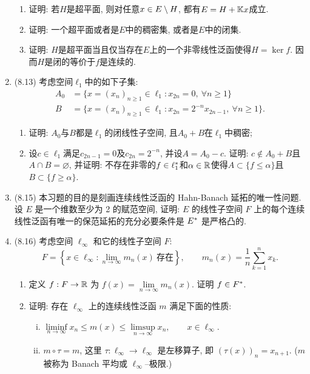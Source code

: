 \begin{enumerate}[label=\textbf{\arabic*.}, ref=\arabic*]
\begin{enumerate}[(1)]
			\item 证明: 若$ H $是超平面, 则对任意$ x\in E\setminus H $, 都有$ E=H+\mathbb{K} x $成立.
			\item 证明: 一个超平面或者是$ E $中的稠密集, 或者是$ E $中的闭集.
			\item 证明: $ H $是超平面当且仅当存在$ E $上的一个非零线性泛函使得$ H=\ker f $. 因而$ H $是闭的等价于$ f $是连续的.
			\end{enumerate}
		\item (8.13) 考虑空间$ \ell_1 $中的如下子集:
			\[
			\begin{aligned}
			A_0&=\{ x=(x_n)_{n\geqslant 1}\in\ell_1 : x_{2n}=0,\ \forall n\geqslant 1 \}\\
			B&=\{ x=(x_n)_{n\geqslant 1}\in\ell_1 : x_{2n}=2^{-n}x_{2n-1},\ \forall n\geqslant 1 \}.
			\end{aligned}
			\]
			\begin{enumerate}[(1)]
			\item 证明: $ A_0 $与$ B $都是$ \ell_1 $的闭线性子空间, 且$ A_0+B $在$\ell_1 $中稠密;
			\item 设$ c\in\ell_1 $满足$ c_{2n-1}=0 $及$ c_{2n}=2^{-n} $, 并设$ A=A_0-c $. 证明: $ c\notin A_0+B $且$ A\cap B=\varnothing $, 并证明: 不存在非零的$ f\in\ell_1^{*} $和$ \alpha\in\mathbb{R} $使得$ A\subset\{ f\leqslant\alpha \} $且$ B\subset\{ f\geqslant\alpha \} $.
			\end{enumerate}
		\item (8.15) 本习题的目的是刻画连续线性泛函的 Hahn-Banach 延拓的唯一性问题. 设 $ E $ 是一个维数至少为 2 的赋范空间, 证明: $ E $ 的线性子空间 $ F $ 上的每个连续线性泛函有唯一的保范延拓的充分必要条件是 $ E^{*} $ 是严格凸的.
		\item (8.16) 考虑空间 $ \ell_{\infty} $ 和它的线性子空间 $ F $:
			\[
				F = \left\{ x\in\ell_{\infty}:\lim_{n\to\infty} m_{n}(x)\ \text{存在} \right\}, \qquad m_{n}(x)=\frac{1}{n}\sum_{k=1}^{n} x_{k}.
			\]
			\begin{enumerate}[(1)]
				\item 定义 $ f:F\to\mathbb{R} $ 为 $ f(x)=\lim\limits_{n\to\infty}m_{n}(x) $. 证明 $ f\in F^{*} $.
				\item 证明: 存在 $ \ell_{\infty} $ 上的连续线性泛函 $ m $ 满足下面的性质:
				\begin{enumerate}[(i)]
					\item $ \liminf\limits_{n\to\infty}x_{n}\leqslant m(x)\leqslant\limsup\limits_{n\to\infty}x_{n}, \qquad x\in\ell_{\infty} $.
					\item $ m\circ \tau=m $, 这里 $ \tau: \ell_{\infty}\to\ell_{\infty} $ 是左移算子, 即 $ (\tau(x))_{n}=x_{n+1} $. ($ m $ 被称为 Banach 平均或 $ \ell_{\infty} $--极限.)

\end{enumerate}
\end{enumerate}
\end{enumerate}
